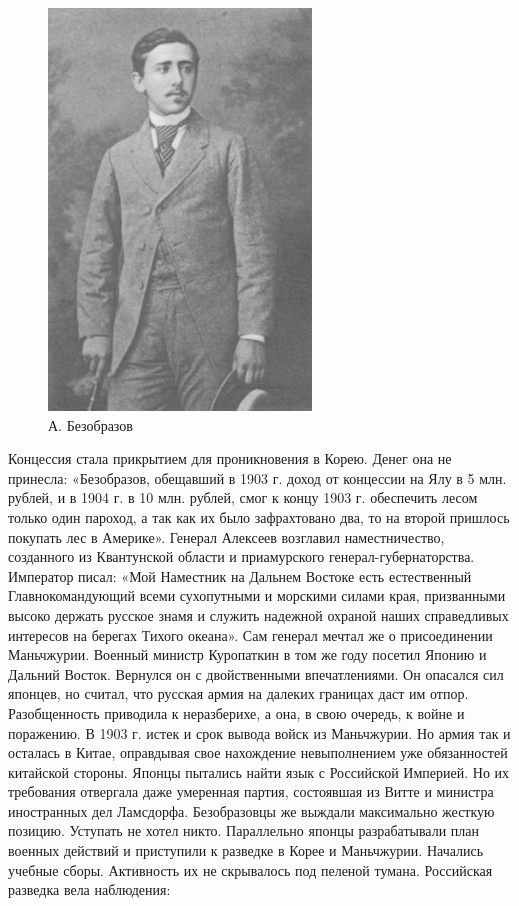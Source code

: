\begin{figure}[h!tb] 
	\centering\includegraphics[scale=0.6]{Data/RYAV_predposylki/Y7AQ96Nf2A4.jpg}
	\caption{А. Безобразов		
	}%
\end{figure}

Концессия стала прикрытием для проникновения в Корею. Денег она не принесла: «Безобразов, обещавший в 1903 г. доход от концессии на Ялу в 5 млн. рублей, и в 1904 г. в 10 млн. рублей, смог к концу 1903 г. обеспечить лесом только один пароход, а так как их было зафрахтовано два, то на второй пришлось покупать лес в Америке».
Генерал Алексеев возглавил наместничество, созданного из Квантунской области и приамурского генерал-губернаторства. Император писал: «Мой Наместник на Дальнем Востоке есть естественный Главнокомандующий всеми сухопутными и морскими силами края, призванными высоко держать русское знамя и служить надежной охраной наших справедливых интересов на берегах Тихого океана». Сам генерал мечтал же о присоединении Маньчжурии.
Военный министр Куропаткин в том же году посетил Японию и Дальний Восток. Вернулся он с двойственными впечатлениями. Он опасался сил японцев, но считал, что русская армия на далеких границах даст им отпор.
Разобщенность приводила к неразберихе, а она, в свою очередь, к войне и поражению.
В 1903 г. истек и срок вывода войск из Маньчжурии. Но армия так и осталась в Китае, оправдывая свое нахождение невыполнением уже обязанностей китайской стороны.
Японцы пытались найти язык с Российской Империей. Но их требования отвергала даже умеренная партия, состоявшая из Витте и министра иностранных дел Ламсдорфа. Безобразовцы же выждали максимально жесткую позицию. Уступать не хотел никто.
Параллельно японцы разрабатывали план военных действий и приступили к разведке в Корее и Маньчжурии. Начались учебные сборы. Активность их не скрывалось под пеленой тумана. Российская разведка вела наблюдения:


